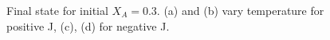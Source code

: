 \documentclass{report}
\begin{document}
        \begin{figure}[!htb]
            \label{fig:Ising-alloy-0.3}
            \caption{Final state for initial $X_A = 0.3$. (a) and (b) vary temperature for positive J, (c), (d) for negative J.}
        \end{figure}
\end{document}
